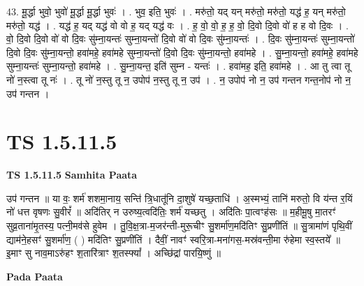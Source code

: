 \documentclass[17pt]{extarticle}
\begin{document}
43. मू॒र्द्धा भुवो॒ भुवो॑ मू॒र्द्धा मू॒र्द्धा भुवः॑ । . भुव॒ इति॒ भुवः॑ । . मरु॑तो॒ यद् यन् मरु॑तो॒ मरु॑तो॒ यद्ध॑ ह॒ यन् मरु॑तो॒ मरु॑तो॒ यद्ध॑ । . यद्ध॑ ह॒ यद् यद्ध॑ वो वो ह॒ यद् यद्ध॑ वः । . ह॒ वो॒ वो॒ ह॒ ह॒ वो॒ दि॒वो दि॒वो वो॑ ह ह वो दि॒वः । . वो॒ दि॒वो दि॒वो वो॑ वो दि॒वः सु॑म्ना॒यन्तः॑ सुम्ना॒यन्तो॑ दि॒वो वो॑ वो दि॒वः सु॑म्ना॒यन्तः॑ । . दि॒वः सु॑म्ना॒यन्तः॑ सुम्ना॒यन्तो॑ दि॒वो दि॒वः सु॑म्ना॒यन्तो॒ हवा॑महे॒ हवा॑महे सुम्ना॒यन्तो॑ दि॒वो दि॒वः सु॑म्ना॒यन्तो॒ हवा॑महे । . सु॒म्ना॒यन्तो॒ हवा॑महे॒ हवा॑महे सुम्ना॒यन्तः॑ सुम्ना॒यन्तो॒ हवा॑महे । . सु॒म्ना॒यन्त॒ इति॑ सुम्न - यन्तः॑ । . हवा॑मह॒ इति॒ हवा॑महे । . आ तु त्वा तू नो॑ न॒स्त्वा तू नः॑ । . तू नो॑ न॒स्तु तू न॒ उपोप॑ न॒स्तु तू न॒ उप॑ । . न॒ उपोप॑ नो न॒ उप॑ गन्तन गन्त॒नोप॑ नो न॒ उप॑ गन्तन । \newline
\pagebreak
{}

\section{ TS 1.5.11.5 }

\textbf{TS 1.5.11.5 } \newline
\textbf{Samhita Paata} \newline

उप॑ गन्तन ॥ या वः॒ शर्म॑ शशमा॒नाय॒ सन्ति॑ त्रि॒धातू॑नि दा॒शुषे॑ यच्छ॒ताधि॑ । अ॒स्मभ्यं॒ तानि॑ मरुतो॒ वि य॑न्त र॒यिं नो॑ धत्त वृषणः सु॒वीरं᳚ ॥ अदि॑तिर् न उरुष्य॒त्वदि॑तिः॒ शर्म॑ यच्छतु । अदि॑तिः पा॒त्वꣳह॑सः ॥ म॒हीमू॒षु मा॒तरꣳ॑ सुव्र॒ताना॑मृ॒तस्य॒ पत्नी॒मव॑से हुवेम । तु॒वि॒क्ष॒त्रा-म॒जर॑न्ती-मुरू॒चीꣳ सु॒शर्मा॑ण॒मदि॑तिꣳ सु॒प्रणी॑तिं ॥ सु॒त्रामा॑णं पृथि॒वीं द्याम॑ने॒हसꣳ॑ सु॒शर्मा॑ण॒ ( ) मदि॑तिꣳ सु॒प्रणी॑तिं । दैवीं॒ नावꣳ॑ स्वरि॒त्रा-मना॑गस॒-मस्र॑वन्ती॒मा रु॑हेमा स्व॒स्तये᳚ ॥ इ॒माꣳ सु नाव॒माऽरु॑हꣳ श॒तारि॑त्राꣳ श॒तस्फ्यां᳚ । अच्छि॑द्रां पारयि॒ष्णुं ॥ \newline

\textbf{Pada Paata} \newline
\end{document}

